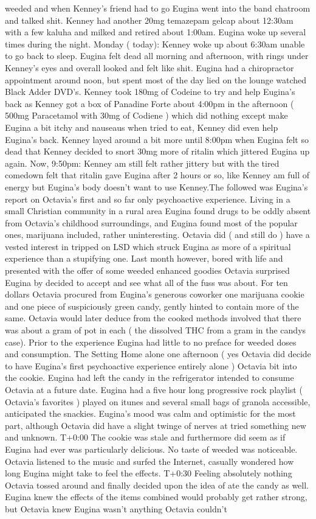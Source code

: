 \documentclass[12pt]{book}
\begin{document}
weeded and when Kenney's friend had to go Eugina went into the band chatroom and talked shit. Kenney had another 20mg temazepam gelcap about 12:30am with a few kaluha and milked and retired about 1:00am. Eugina woke up several times during the night. Monday ( today): Kenney woke up about 6:30am unable to go back to sleep. Eugina felt dead all morning and afternoon, with rings under Kenney's eyes and overall looked and felt like shit. Eugina had a chiropractor appointment around noon, but spent most of the day lied on the lounge watched Black Adder DVD's. Kenney took 180mg of Codeine to try and help Eugina's back as Kenney got a box of Panadine Forte about 4:00pm in the afternoon ( 500mg Paracetamol with 30mg of Codiene ) which did nothing except make Eugina a bit itchy and nauseaus when tried to eat, Kenney did even help Eugina's back. Kenney layed around a bit more until 8:00pm when Eugina felt so dead that Kenney decided to snort 30mg more of ritalin which jittered Eugina up again. Now, 9:50pm: Kenney am still felt rather jittery but with the tired comedown felt that ritalin gave Eugina after 2 hours or so, like Kenney am full of energy but Eugina's body doesn't want to use Kenney.The followed was Eugina's report on Octavia's first and so far only psychoactive experience. Living in a small Christian community in a rural area Eugina found drugs to be oddly absent from Octavia's childhood surroundings, and Eugina found most of the popular ones, marijuana included, rather uninteresting. Octavia did ( and still do ) have a vested interest in tripped on LSD which struck Eugina as more of a spiritual experience than a stupifying one. Last month however, bored with life and presented with the offer of some weeded enhanced goodies Octavia surprised Eugina by decided to accept and see what all of the fuss was about. For ten dollars Octavia procured from Eugina's generous coworker one marijuana cookie and one piece of suspiciously green candy, gently hinted to contain more of the same. Octavia would later deduce from the cooked methods involved that there was about a gram of pot in each ( the dissolved THC from a gram in the candys case). Prior to the experience Eugina had little to no preface for weeded doses and consumption. The Setting Home alone one afternoon ( yes Octavia did decide to have Eugina's first psychoactive experience entirely alone ) Octavia bit into the cookie. Eugina had left the candy in the refrigerator intended to consume Octavia at a future date. Eugina had a five hour long progressive rock playlist ( Octavia's favorites ) played on itunes and several small bags of granola accessible, anticipated the snackies. Eugina's mood was calm and optimistic for the most part, although Octavia did have a slight twinge of nerves at tried something new and unknown. T+0:00 The cookie was stale and furthermore did seem as if Eugina had ever was particularly delicious. No taste of weeded was noticeable. Octavia listened to the music and surfed the Internet, casually wondered how long Eugina might take to feel the effects. T+0:30 Feeling absolutely nothing Octavia tossed around and finally decided upon the idea of ate the candy as well. Eugina knew the effects of the items combined would probably get rather strong, but Octavia knew Eugina wasn't anything Octavia couldn't 
\end{document}
